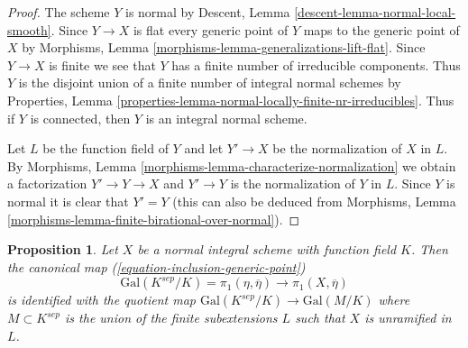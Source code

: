 \documentclass{stacks-project}
\theoremstyle{plain}
\newtheorem{proposition}[subsection]{Proposition}
\theoremstyle{definition}
\theoremstyle{remark}
\numberwithin{equation}{subsection}
\begin{document}
\begin{proof}
The scheme $Y$ is normal by
Descent, Lemma \ref{descent-lemma-normal-local-smooth}.
Since $Y \to X$ is flat every generic point of $Y$ maps
to the generic point of $X$ by
Morphisms, Lemma \ref{morphisms-lemma-generalizations-lift-flat}.
Since $Y \to X$ is finite we see that $Y$ has a finite number
of irreducible components. Thus $Y$ is the disjoint union of
a finite number of integral normal schemes by
Properties, Lemma \ref{properties-lemma-normal-locally-finite-nr-irreducibles}.
Thus if $Y$ is connected, then $Y$ is an integral normal scheme.

\medskip\noindent
Let $L$ be the function field of $Y$ and let $Y' \to X$ be the normalization
of $X$ in $L$. By
Morphisms, Lemma \ref{morphisms-lemma-characterize-normalization}
we obtain a factorization $Y' \to Y \to X$ and $Y' \to Y$ is
the normalization of $Y$ in $L$. Since $Y$ is normal it is clear
that $Y' = Y$ (this can also be deduced from
Morphisms, Lemma \ref{morphisms-lemma-finite-birational-over-normal}).
\end{proof}

\begin{proposition}
\label{proposition-normal}
Let $X$ be a normal integral scheme with function field $K$.
Then the canonical map (\ref{equation-inclusion-generic-point})
$$
\text{Gal}(K^{sep}/K) = \pi_1(\eta, \overline{\eta})
\longrightarrow \pi_1(X, \overline{\eta})
$$
is identified with the quotient map
$\text{Gal}(K^{sep}/K) \to \text{Gal}(M/K)$ where $M \subset K^{sep}$
is the union of the finite subextensions $L$
such that $X$ is unramified in $L$.
\end{proposition}
\end{document}
